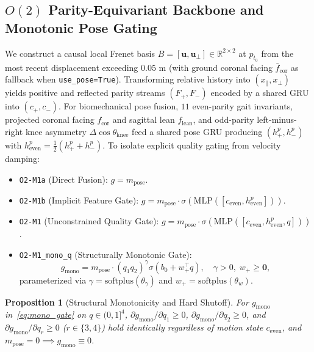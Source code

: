 \documentclass[journal]{IEEEtran}
\newtheorem{proposition}{Proposition}
\begin{document}
\subsection{$O(2)$ Parity-Equivariant Backbone and Monotonic Pose Gating}
We construct a causal local Frenet basis $B = [\mathbf{u}, \mathbf{u}_\perp] \in \mathbb{R}^{2\times 2}$ at $p_{t_0}$ from the most recent displacement exceeding $0.05\text{ m}$ (with ground coronal facing $\bar{f}_{\text{cor}}$ as fallback when \texttt{use\_pose=True}). Transforming relative history into $(x_{\parallel}, x_{\perp})$ yields positive and reflected parity streams $(F_+, F_-)$ encoded by a shared GRU into $(c_+, c_-)$. For biomechanical pose fusion, $11$ even-parity gait invariants, projected coronal facing $f_{\text{cor}}$ and sagittal lean $f_{\text{lean}}$, and odd-parity left-minus-right knee asymmetry $\Delta \cos\theta_{\text{knee}}$ feed a shared pose GRU producing $(h^p_+, h^p_-)$ with $h^p_{\text{even}} = \frac{1}{2}(h^p_+ + h^p_-)$. To isolate explicit quality gating from velocity damping:
\begin{itemize}
  \item \texttt{O2-M1a} (Direct Fusion): $g = m_{\text{pose}}$.
  \item \texttt{O2-M1b} (Implicit Feature Gate): $g = m_{\text{pose}} \cdot \sigma(\text{MLP}([c_{\text{even}}, h^p_{\text{even}}]))$.
  \item \texttt{O2-M1} (Unconstrained Quality Gate): $g = m_{\text{pose}} \cdot \sigma(\text{MLP}([c_{\text{even}}, h^p_{\text{even}}, q]))$.
  \item \texttt{O2-M1\_mono\_q} (Structurally Monotonic Gate):
  \begin{equation}
    g_{\text{mono}} = m_{\text{pose}} \cdot (q_1 q_2)^{\gamma} \sigma(b_0 + w_+^\top q), \quad \gamma > 0, \; w_+ \ge \mathbf{0},
    \label{eq:mono_gate}
  \end{equation}
  parameterized via $\gamma = \text{softplus}(\theta_\gamma)$ and $w_+ = \text{softplus}(\theta_w)$.
\end{itemize}

\begin{proposition}[Structural Monotonicity and Hard Shutoff]
For $g_{\text{mono}}$ in~\eqref{eq:mono_gate} on $q \in (0, 1]^4$, $\partial g_{\text{mono}} / \partial q_1 \ge 0$, $\partial g_{\text{mono}} / \partial q_2 \ge 0$, and $\partial g_{\text{mono}} / \partial q_r \ge 0$ ($r \in \{3,4\}$) hold identically regardless of motion state $c_{\text{even}}$, and $m_{\text{pose}} = 0 \implies g_{\text{mono}} \equiv 0$.
\end{proposition}
\end{document}
